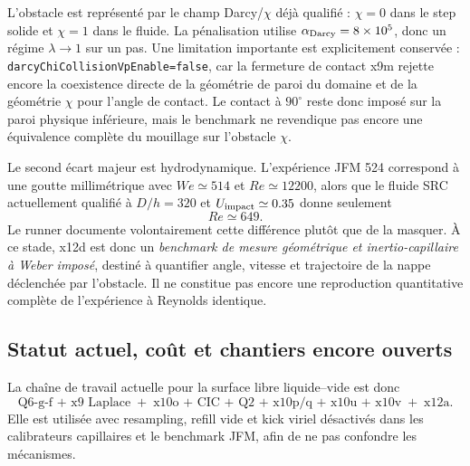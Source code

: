 \documentclass[11pt,a4paper]{article}
\begin{document}
L'obstacle est représenté par le champ Darcy/$\chi$ déjà qualifié : $\chi=0$ dans le step solide et $\chi=1$ dans le fluide. La pénalisation utilise $\alpha_{\rm Darcy}=8\times10^5$, donc un régime $\lambda\rightarrow1$ sur un pas. Une limitation importante est explicitement conservée : \texttt{darcyChiCollisionVpEnable=false}, car la fermeture de contact x9m rejette encore la coexistence directe de la géométrie de paroi du domaine et de la géométrie $\chi$ pour l'angle de contact. Le contact à $90^\circ$ reste donc imposé sur la paroi physique inférieure, mais le benchmark ne revendique pas encore une équivalence complète du mouillage sur l'obstacle $\chi$.

Le second écart majeur est hydrodynamique. L'expérience JFM 524 correspond à une goutte millimétrique avec $We\simeq514$ et $Re\simeq12200$, alors que le fluide SRC actuellement qualifié à $D/h=320$ et $U_{\rm impact}\simeq0.35$ donne seulement
\[
  Re\simeq649.
\]
Le runner documente volontairement cette différence plutôt que de la masquer. À ce stade, x12d est donc un \emph{benchmark de mesure géométrique et inertio-capillaire à Weber imposé}, destiné à quantifier angle, vitesse et trajectoire de la nappe déclenchée par l'obstacle. Il ne constitue pas encore une reproduction quantitative complète de l'expérience à Reynolds identique.

\subsection{Statut actuel, coût et chantiers encore ouverts}

La chaîne de travail actuelle pour la surface libre liquide--vide est donc
\begin{equation}
  \boxed{
  \text{Q6-g-f + x9 Laplace}
  \;+\;
  \text{x10o + CIC + Q2 + x10p/q + x10u + x10v}
  \;+\;
  \text{x12a}.
  }
\end{equation}
Elle est utilisée avec resampling, refill vide et kick viriel désactivés dans les calibrateurs capillaires et le benchmark JFM, afin de ne pas confondre les mécanismes.
\end{document}
